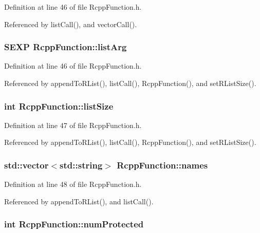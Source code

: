 Definition at line 46 of file RcppFunction.h.

Referenced by listCall(), and vectorCall().\hypertarget{classRcppFunction_a3b8a2c8441c9791f9fe5bd5273bbceec}{
\subsubsection[{listArg}]{\setlength{\rightskip}{0pt plus 5cm}SEXP {\bf RcppFunction::listArg}}}
\label{classRcppFunction_a3b8a2c8441c9791f9fe5bd5273bbceec}


Definition at line 46 of file RcppFunction.h.

Referenced by appendToRList(), listCall(), RcppFunction(), and setRListSize().\hypertarget{classRcppFunction_ac3a42478ffd123f430ba3e09099db6f8}{
\subsubsection[{listSize}]{\setlength{\rightskip}{0pt plus 5cm}int {\bf RcppFunction::listSize}}}
\label{classRcppFunction_ac3a42478ffd123f430ba3e09099db6f8}


Definition at line 47 of file RcppFunction.h.

Referenced by appendToRList(), listCall(), RcppFunction(), and setRListSize().\hypertarget{classRcppFunction_abf9e86df5e1a290a5f321e6051f0d2b2}{
\subsubsection[{names}]{\setlength{\rightskip}{0pt plus 5cm}std::vector$<$std::string$>$ {\bf RcppFunction::names}}}
\label{classRcppFunction_abf9e86df5e1a290a5f321e6051f0d2b2}


Definition at line 48 of file RcppFunction.h.

Referenced by appendToRList(), and listCall().\hypertarget{classRcppFunction_adc777e7d1628ccc4f531a8375f30f385}{
\subsubsection[{numProtected}]{\setlength{\rightskip}{0pt plus 5cm}int {\bf RcppFunction::numProtected}}}
\label{classRcppFunction_adc777e7d1628ccc4f531a8375f30f385}


